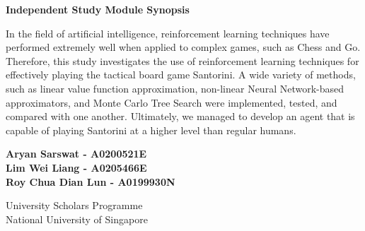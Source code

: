\documentclass[a4paper,12pt,table]{article}
\begin{document}
    
\begin{titlepage}
    \begin{center} 
        \textbf{{\Huge Independent Study Module Synopsis}}
    \vspace{3cm}
    
    \end{center}
  \Large In the field of artificial intelligence, reinforcement learning techniques have performed extremely well when applied to complex games, such as Chess and Go. Therefore, this study investigates the use of reinforcement learning techniques for effectively playing the tactical board game Santorini. A wide variety of methods, such as linear value function approximation, non-linear Neural Network-based approximators, and Monte Carlo Tree Search were implemented, tested, and compared with one another. Ultimately, we managed to develop an agent that is capable of playing Santorini at a higher level than regular humans. \par
 
        \vspace{0.5cm}
 
        \vspace{1.5cm}
 
 
        \vfill
 
 
        \begin{center}
            \textbf{Aryan Sarswat -  A0200521E \\
            Lim Wei Liang - A0205466E \\
            Roy Chua Dian Lun - A0199930N \\ }
    
           \vspace{0.8cm}
    
          University Scholars Programme\\
           National University of Singapore\\
        \end{center}
 \end{titlepage}
\end{document}
